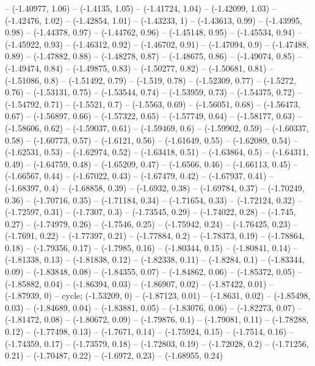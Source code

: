 -- (-1.40977, 1.06)
-- (-1.4135, 1.05)
-- (-1.41724, 1.04)
-- (-1.42099, 1.03)
-- (-1.42476, 1.02)
-- (-1.42854, 1.01)
-- (-1.43233, 1)
-- (-1.43613, 0.99)
-- (-1.43995, 0.98)
-- (-1.44378, 0.97)
-- (-1.44762, 0.96)
-- (-1.45148, 0.95)
-- (-1.45534, 0.94)
-- (-1.45922, 0.93)
-- (-1.46312, 0.92)
-- (-1.46702, 0.91)
-- (-1.47094, 0.9)
-- (-1.47488, 0.89)
-- (-1.47882, 0.88)
-- (-1.48278, 0.87)
-- (-1.48675, 0.86)
-- (-1.49074, 0.85)
-- (-1.49474, 0.84)
-- (-1.49875, 0.83)
-- (-1.50277, 0.82)
-- (-1.50681, 0.81)
-- (-1.51086, 0.8)
-- (-1.51492, 0.79)
-- (-1.519, 0.78)
-- (-1.52309, 0.77)
-- (-1.5272, 0.76)
-- (-1.53131, 0.75)
-- (-1.53544, 0.74)
-- (-1.53959, 0.73)
-- (-1.54375, 0.72)
-- (-1.54792, 0.71)
-- (-1.5521, 0.7)
-- (-1.5563, 0.69)
-- (-1.56051, 0.68)
-- (-1.56473, 0.67)
-- (-1.56897, 0.66)
-- (-1.57322, 0.65)
-- (-1.57749, 0.64)
-- (-1.58177, 0.63)
-- (-1.58606, 0.62)
-- (-1.59037, 0.61)
-- (-1.59469, 0.6)
-- (-1.59902, 0.59)
-- (-1.60337, 0.58)
-- (-1.60773, 0.57)
-- (-1.6121, 0.56)
-- (-1.61649, 0.55)
-- (-1.62089, 0.54)
-- (-1.62531, 0.53)
-- (-1.62974, 0.52)
-- (-1.63418, 0.51)
-- (-1.63864, 0.5)
-- (-1.64311, 0.49)
-- (-1.64759, 0.48)
-- (-1.65209, 0.47)
-- (-1.6566, 0.46)
-- (-1.66113, 0.45)
-- (-1.66567, 0.44)
-- (-1.67022, 0.43)
-- (-1.67479, 0.42)
-- (-1.67937, 0.41)
-- (-1.68397, 0.4)
-- (-1.68858, 0.39)
-- (-1.6932, 0.38)
-- (-1.69784, 0.37)
-- (-1.70249, 0.36)
-- (-1.70716, 0.35)
-- (-1.71184, 0.34)
-- (-1.71654, 0.33)
-- (-1.72124, 0.32)
-- (-1.72597, 0.31)
-- (-1.7307, 0.3)
-- (-1.73545, 0.29)
-- (-1.74022, 0.28)
-- (-1.745, 0.27)
-- (-1.74979, 0.26)
-- (-1.7546, 0.25)
-- (-1.75942, 0.24)
-- (-1.76425, 0.23)
-- (-1.7691, 0.22)
-- (-1.77397, 0.21)
-- (-1.77884, 0.2)
-- (-1.78373, 0.19)
-- (-1.78864, 0.18)
-- (-1.79356, 0.17)
-- (-1.7985, 0.16)
-- (-1.80344, 0.15)
-- (-1.80841, 0.14)
-- (-1.81338, 0.13)
-- (-1.81838, 0.12)
-- (-1.82338, 0.11)
-- (-1.8284, 0.1)
-- (-1.83344, 0.09)
-- (-1.83848, 0.08)
-- (-1.84355, 0.07)
-- (-1.84862, 0.06)
-- (-1.85372, 0.05)
-- (-1.85882, 0.04)
-- (-1.86394, 0.03)
-- (-1.86907, 0.02)
-- (-1.87422, 0.01)
-- (-1.87939, 0)
-- cycle;
\drawBand (-1.53209, 0)
-- (-1.87123, 0.01)
-- (-1.8631, 0.02)
-- (-1.85498, 0.03)
-- (-1.84689, 0.04)
-- (-1.83881, 0.05)
-- (-1.83076, 0.06)
-- (-1.82273, 0.07)
-- (-1.81472, 0.08)
-- (-1.80672, 0.09)
-- (-1.79876, 0.1)
-- (-1.79081, 0.11)
-- (-1.78288, 0.12)
-- (-1.77498, 0.13)
-- (-1.7671, 0.14)
-- (-1.75924, 0.15)
-- (-1.7514, 0.16)
-- (-1.74359, 0.17)
-- (-1.73579, 0.18)
-- (-1.72803, 0.19)
-- (-1.72028, 0.2)
-- (-1.71256, 0.21)
-- (-1.70487, 0.22)
-- (-1.6972, 0.23)
-- (-1.68955, 0.24)
